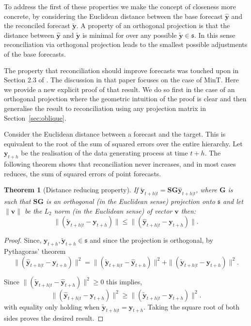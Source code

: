 \documentclass[12pt]{article}
\newtheorem{theo}{Theorem}[section]
\theoremstyle{definition}
\theoremstyle{property}
\begin{document}
	To address the first of these properties we make the concept of closeness more concrete, by considering the Euclidean distance between the base forecast $\hat{\bm{y}}$ and the reconciled forecast  $\tilde{\bm{y}}$.  A property of an orthogonal projection is that the distance between $\hat{\bm{y}}$ and $\tilde{\bm{y}}$ is minimal for over any possible $\tilde{\bm{y}}\in\mathfrak{s}$.  In this sense reconciliation via orthogonal projection leads to the smallest possible adjustments of the base forecasts.
	
	The property that reconciliation should improve forecasts was touched upon in Section 2.3 of \cite{WicEtAl2019}.  The discussion in that paper focuses on the case of MinT. Here we provide a new explicit proof of that result.  We do so first in the case of an orthogonal projection where the geometric intuition of the proof is clear and then generalise the result to reconciliation using any projection matrix in Section~\ref{sec:oblique}.
		
	Consider the Euclidean distance between a forecast and the target. This is equivalent to the root of the sum of squared errors over the entire hierarchy. Let $\bm{y}_{t+h}$ be the realisation of the data generating process at time $t+h$. The following theorem shows that reconciliation never increases, and in most cases reduces, the sum of squared errors of point forecasts.
	
	
	\begin{theo}[Distance reducing property]\label{th:distred}
		If $\tilde{\bm{y}}_{t+h|t}=\bm{S}\bm{G}\hat{\bm{y}}_{t+h|t}$, where $\bm{G}$ is such that $\bm{S}\bm{G}$ is an orthogonal (in the Euclidean sense) projection onto $\mathfrak{s}$ and let $\|\bm{v}\|$ be the $L_2$ norm (in the Euclidean sense) of vector $\bm{v}$ then:
		\begin{equation}
		\|(\tilde{\bm{y}}_{t+h|t}-\bm{y}_{t+h})\|\le\|(\hat{\bm{y}}_{t+h|t}-\bm{y}_{t+h})\|.
		\end{equation}
	\end{theo}
	\begin{proof}
		Since, $\bm{y}_{t+h},\tilde{\bm{y}}_{t+h}\in\mathfrak{s}$ and since the projection is orthogonal, by Pythagoras' theorem
		\begin{equation}
		\|(\hat{\bm{y}}_{t+h|t}-\bm{y}_{t+h})\|^2=\|(\tilde{\bm{y}}_{t+h|t}-\hat{\bm{y}}_{t+h})\|^2+\|(\tilde{\bm{y}}_{t+h|t}-\bm{y}_{t+h})\|^2.
		\end{equation}
		
		Since $\|(\tilde{\bm{y}}_{t+h|t}-\hat{\bm{y}}_{t+h})\|^2\ge 0$ this implies,
		\begin{equation}
		\|(\hat{\bm{y}}_{t+h|t}-\bm{y}_{t+h})\|^2\ge\|(\tilde{\bm{y}}_{t+h|t}-\bm{y}_{t+h})\|^2.
		\end{equation}
		with equality only holding when $\tilde{\bm{y}}_{t+h|t}=\hat{\bm{y}}_{t+h}$.  Taking the square root of both sides proves the desired result.
	\end{proof}
		
\end{document}
